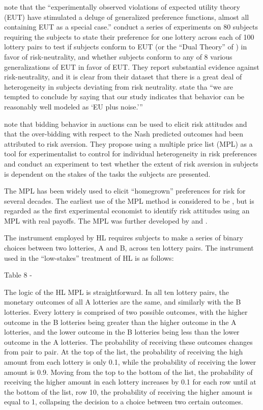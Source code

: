 \documentclass[../main.tex]{subfiles}
\begin{document}
\textcite[1291]{Hey1994} note that the \enquote{experimentally observed violations of expected utility theory (EUT) have stimulated a deluge of generalized preference functions, almost all containing  EUT as a special case.}
\textcite{Hey1994} conduct a series of experiments on 80 subjects requiring the subjects to state their preference for one lottery across each of 100 lottery pairs to test if subjects conform to EUT (or the \enquote{Dual Theory} of \textcite{Yaari1987}) in favor of risk-neutrality, and whether subjects conform to any of 8 various generalizations of EUT in favor of EUT.
They report substantial evidence against risk-neutrality, and it is clear from their dataset that there is a great deal of heterogeneity in subjects deviating from risk neutrality.
\textcite[1322]{Hey1994} state tha \enquote{we are tempted to conclude by saying that our study indicates that behavior can be reasonably well modeled \textelp{} as \enquote{EU plus noise.}} 

\textcite[1644]{Holt2002} note that bidding behavior in auctions can be used to elicit risk attitudes and that the over-bidding with respect to the Nash predicted outcomes had been attributed to risk aversion.
They propose using a multiple price list (MPL) as a tool for experimentalist to control for individual heterogeneity in risk preferences and conduct an experiment to test whether the extent of risk aversion in subjects is dependent on the stakes of the tasks the subjects are presented.

 
The MPL has been widely used to elicit \enquote{homegrown} preferences for risk for several decades.
The earliest use of the MPL method is considered to be \textcite{Miller1969}, but \textcite{Binswanger1980, Binswanger1981} is regarded as the first experimental economist to identify risk attitudes using an MPL with real payoffs.
The MPL was further developed by \textcite{Schubert1999} and \textcite{Holt2002}.

The instrument employed by HL requires subjects to make a series of binary choices between two lotteries, A and B, across ten lottery pairs.
The instrument used in the \enquote{low-stakes} treatment of HL is as follows:



Table 8 - \textcite{Holt2002}


The logic of the HL MPL is straightforward.
In all ten lottery pairs, the monetary outcomes of  all A lotteries are the same, and similarly with the B lotteries.
Every lottery is comprised of two possible outcomes, with the higher outcome in the B lotteries being greater than the higher outcome in the A lotteries, and the lower outcome in the B lotteries being less than the lower outcome in the A lotteries.
The probability of receiving these outcomes changes from pair to pair.
At the top of the list, the probability of receiving the high amount from each lottery is only 0.1, while the probability of receiving the lower amount is 0.9.
Moving from the top to the bottom of the list, the probability of receiving the higher amount in each lottery increases by 0.1 for each row until at the bottom of the list, row 10, the probability of receiving the higher amount is equal to 1, collapsing the decision to a choice between two certain outcomes.
\end{document}
